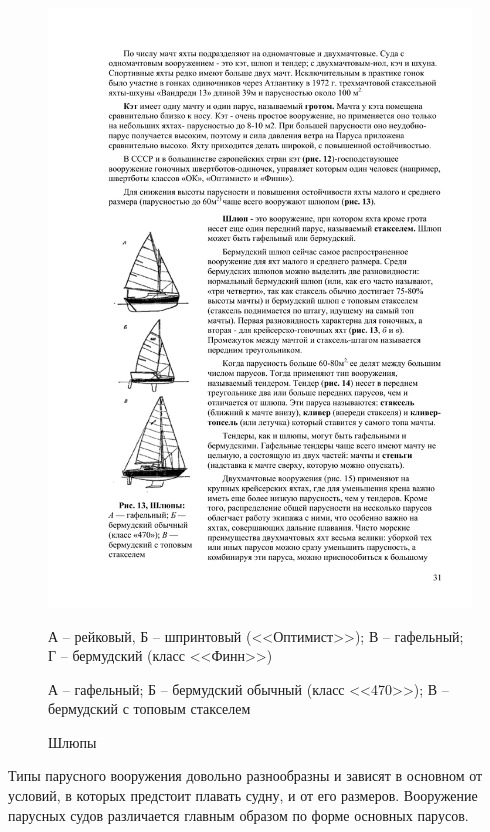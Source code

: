 \documentclass[a4paper, 12pt, twoside, final]{scrbook}
\begin{document}
\begin{figure}[htbp]
\begin{minipage}[b]{0.49\textwidth}
		\centering\includegraphics{Shlyupy}
		\caption{Шлюпы}
		\label{fig:13}
	\end{minipage}
	\par
	\smallskip
	\begin{minipage}[b]{0.49\textwidth}
		\centering\small
		А \--- рейковый,
		Б \--- шпринтовый (<<Оптимист>>);
		В \--- гафельный;
		Г \--- бермудский (класс <<Финн>>)
	\end{minipage}
	\hfil\hfil%
	\begin{minipage}[b]{0.49\textwidth}
		\centering\small
		А \--- гафельный;
		Б \--- бермудский обычный (класс <<470>>);
		В \--- бермудский с топовым стакселем
	\end{minipage}
\end{figure}


Типы парусного вооружения довольно разнообразны и зависят в основном
от условий, в которых предстоит плавать судну, и от его размеров.
Вооружение парусных судов различается главным образом по форме основных
парусов.
\end{document}
